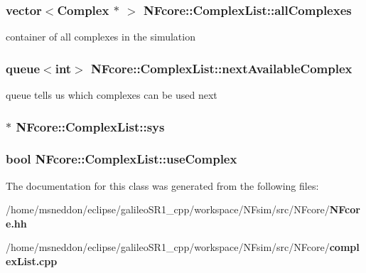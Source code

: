 \subsubsection{\setlength{\rightskip}{0pt plus 5cm}vector$<${\bf Complex} $\ast$ $>$ {\bf NFcore::ComplexList::allComplexes}\hspace{0.3cm}{\tt  [protected]}}\label{classNFcore_1_1ComplexList_146d4a4db088fb6c70c67e3c9dca62ae}


container of all complexes in the simulation 
\subsubsection{\setlength{\rightskip}{0pt plus 5cm}queue$<$int$>$ {\bf NFcore::ComplexList::nextAvailableComplex}\hspace{0.3cm}{\tt  [protected]}}\label{classNFcore_1_1ComplexList_981bea128eeea140b44ad1b28b50784a}


queue tells us which complexes can be used next 
\subsubsection{$\ast$ {\bf NFcore::ComplexList::sys}\hspace{0.3cm}{\tt  [protected]}}\label{classNFcore_1_1ComplexList_465b362ba62263c15c43973af283ccad}


\subsubsection{\setlength{\rightskip}{0pt plus 5cm}bool {\bf NFcore::ComplexList::useComplex}\hspace{0.3cm}{\tt  [protected]}}\label{classNFcore_1_1ComplexList_9392048fb2f9210ed5ee8161f667f467}




The documentation for this class was generated from the following files:\begin{CompactItemize}
\item 
/home/msneddon/eclipse/galileoSR1\_\-cpp/workspace/NFsim/src/NFcore/{\bf NFcore.hh}\item 
/home/msneddon/eclipse/galileoSR1\_\-cpp/workspace/NFsim/src/NFcore/{\bf complexList.cpp}\end{CompactItemize}
